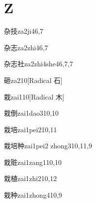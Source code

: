 
\section*{Z}

\begin{verbete}{杂技}{za2ji4}{6,7}
\end{verbete}

\begin{verbete}{杂志}{za2zhi4}{6,7}
\end{verbete}

\begin{verbete}{杂志社}{za2zhi4she4}{6,7,7}
\end{verbete}

\begin{verbete}{砸}{za2}{10}[Radical 石]
\end{verbete}

\begin{verbete}{栽}{zai1}{10}[Radical 木]
\end{verbete}

\begin{verbete}{栽倒}{zai1dao3}{10,10}
\end{verbete}

\begin{verbete}{栽培}{zai1pei2}{10,11}
\end{verbete}

\begin{verbete}{栽培种}{zai1pei2 zhong3}{10,11,9}
\end{verbete}

\begin{verbete}{栽赃}{zai1zang1}{10,10}
\end{verbete}

\begin{verbete}{栽植}{zai1zhi2}{10,12}
\end{verbete}

\begin{verbete}{栽种}{zai1zhong4}{10,9}
\end{verbete}

